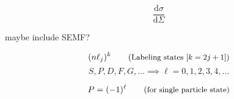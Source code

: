\begin{equation*}
    \frac{\mathrm{d}\sigma}{\mathrm{d} \Sigma}
\end{equation*}

maybe include SEMF?

\begin{equation*}
    (n \ell_{j})^{k} \comment{Labeling states [$k=2j+1$]}
\end{equation*}
\begin{equation*}
    S,P,D,F,G,\dots\implies\ell=0,1,2,3,4,\dots
\end{equation*}

\begin{equation*}
    P = (-1)^{\ell} \comment{for single particle state}
\end{equation*}
